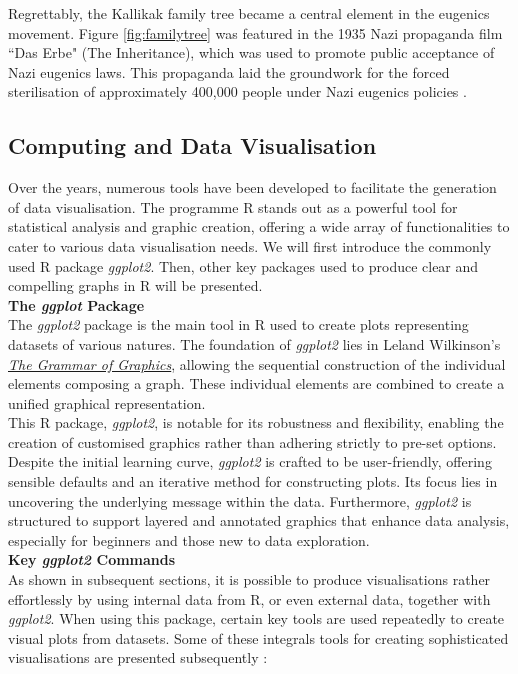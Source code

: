 \documentclass{article}\usepackage[]{graphicx}\usepackage[]{xcolor}
\numberwithin{equation}{section}
\begin{document}
\noindent
Regrettably, the Kallikak family tree became a central element in the eugenics movement. Figure \ref{fig:familytree} was featured in the 1935 Nazi propaganda film ``Das Erbe" (The Inheritance), which was used to promote public acceptance of Nazi eugenics laws. This propaganda laid the groundwork for the forced sterilisation of approximately 400,000 people under Nazi eugenics policies \cite{eugenics}.

\subsection{Computing and Data Visualisation}
\noindent
Over the years, numerous tools have been developed to facilitate the generation of data visualisation. The programme R stands out as a powerful tool for statistical analysis and graphic creation, offering a wide array of functionalities to cater to various data visualisation needs. We will first introduce the commonly used R package \textit{ggplot2}. Then, other key packages used to produce clear and compelling graphs in R will be presented.\\

\noindent \textbf{The \textit{ggplot} Package}\\
\noindent
The \textit{ggplot2} package is the main tool in R used to create plots representing datasets of various natures. The foundation of \textit{ggplot2} lies in Leland Wilkinson's \href{https://link.springer.com/chapter/10.1007/978-3-642-21551-3_13}{\textit{The Grammar of Graphics}}, allowing the sequential construction of the individual elements composing a graph. These individual elements are combined to create a unified graphical representation.\\

\noindent
This R package, \textit{ggplot2}, is notable for its robustness and flexibility, enabling the creation of customised graphics rather than adhering strictly to pre-set options. Despite the initial learning curve, \textit{ggplot2} is crafted to be user-friendly, offering sensible defaults and an iterative method for constructing plots. Its focus lies in uncovering the underlying message within the data. Furthermore, \textit{ggplot2} is structured to support layered and annotated graphics that enhance data analysis, especially for beginners and those new to data exploration.\\

\noindent\textbf{Key \textit{ggplot2} Commands}\\
\noindent 
As shown in subsequent sections, it is possible to produce visualisations rather effortlessly by using internal data from R, or even external data, together with \textit{ggplot2}. When using this package, certain key tools are used repeatedly to create visual plots from datasets. Some of these integrals tools for creating sophisticated visualisations are presented subsequently \cite{ggplot2}:\\
\end{document}
